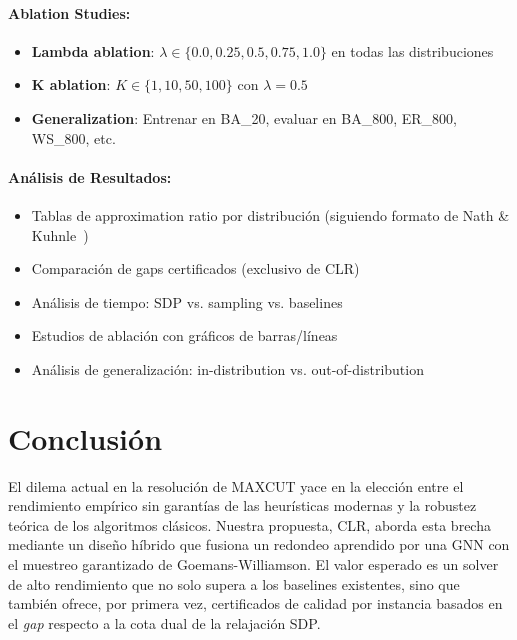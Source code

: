 \documentclass{article}
\begin{document}
\paragraph{Ablation Studies:}
\begin{itemize}
    \item \textbf{Lambda ablation}: $\lambda \in \{0.0, 0.25, 0.5, 0.75, 1.0\}$ en todas las distribuciones
    \item \textbf{K ablation}: $K \in \{1, 10, 50, 100\}$ con $\lambda = 0.5$
    \item \textbf{Generalization}: Entrenar en BA\_20, evaluar en BA\_800, ER\_800, WS\_800, etc.
\end{itemize}

\paragraph{Análisis de Resultados:}
\begin{itemize}
    \item Tablas de approximation ratio por distribución (siguiendo formato de Nath \& Kuhnle~\cite{nath2024benchmarkmaximumcutstandardization})
    \item Comparación de gaps certificados (exclusivo de CLR)
    \item Análisis de tiempo: SDP vs. sampling vs. baselines
    \item Estudios de ablación con gráficos de barras/líneas
    \item Análisis de generalización: in-distribution vs. out-of-distribution
\end{itemize}

\section{Conclusión}

El dilema actual en la resolución de MAXCUT yace en la elección entre el rendimiento empírico sin garantías de las heurísticas modernas y la robustez teórica de los algoritmos clásicos. Nuestra propuesta, CLR, aborda esta brecha mediante un diseño híbrido que fusiona un redondeo aprendido por una GNN con el muestreo garantizado de Goemans-Williamson. El valor esperado es un solver de alto rendimiento que no solo supera a los baselines existentes, sino que también ofrece, por primera vez, certificados de calidad por instancia basados en el \textit{gap} respecto a la cota dual de la relajación SDP.
\end{document}
